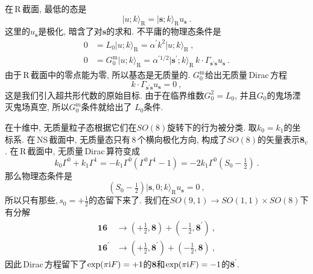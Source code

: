 在\,R\,截面, 最低的态是
\begin{equation}
    \lvert u;k\rangle_{\text{R}} = \lvert\mathbf{s};k\rangle_{\text{R}} u_{\mathbf{s}} \:. \label{10.5.12}
\end{equation}
这里的$ u_{\mathbf{s}} $是极化, 暗含了对$ \mathbf{s} $的求和. 不平庸的物理态条件是
\begin{subequations}
    \begin{align}
        0 &= L_{0}\lvert u;k\rangle_{\text{R}} = \alpha^{\prime}k^{2}\lvert u;k\rangle_{\text{R}} \:, \label{10.5.13a}\\
        0 &= G_{0}^{\text{m}}\lvert u;k\rangle_{\text{R}}
        =\alpha^{\prime 1/2} \lvert \mathbf{s}^{\prime};k\rangle_{\text{R}}\, k\cdot \Gamma_{\mathbf{s}^{\prime}\mathbf{s}} u_{\mathbf{s}} \:. \label{10.5.13b}
    \end{align} \label{10.5.13}
\end{subequations}
由于\,R\,截面中的零点能为零, 所以基态是无质量的. $G_{0}^{\text{m}} $给出无质量\,Dirac\,方程
\begin{equation}
    k\cdot \Gamma_{\mathbf{s}^{\prime}\mathbf{s}} u_{\mathbf{s}} =0\:, \label{10.5.14}
\end{equation}
这是我们引入超共形代数的原始目标. 由于在临界维数$ G_{0}^{2} = L_{0}$, 并且$ G_{0} $的鬼场湮灭鬼场真空, 所以$ G_{0}^{\text{m}} $条件就给出了 $L_{0} $条件. 

在十维中, 无质量粒子态根据它们在$ SO(8) $旋转下的行为被分类. 取$ k_{0}=k_{1} $的坐标系. 在\,NS\,截面中, 无质量态只有\,8\,个横向极化方向, 构成了$ SO(8) $的矢量表示$ \mathbf{8}_{v}$. 在\,R\,截面中, 无质量\,Dirac\,算符变成
\begin{equation}
    k_{0}\Gamma^{0}+k_{1}\Gamma^{1} = -k_{1}\Gamma^{0}(\Gamma^{0}\Gamma^{1}-1)=-2k_{1}\Gamma^{0}(S_{0}-\tfrac{1}{2})\:.\label{10.5.15}
\end{equation}
那么物理态条件是
\begin{equation}
    (S_{0}-\tfrac{1}{2})\lvert\mathbf{s},0;k\rangle_{\text{R}} u_{\mathbf{s}} =0 \:,\label{10.5.16}
\end{equation}
所以只有那些$,s_{0}=+\frac{1}{2} $的态留下来了. 我们在$ SO(9,1)\to SO(1,1)\times SO(8) $下有分解
\begin{subequations}
    \begin{align}
        \mathbf{16} &\to (+\tfrac{1}{2},\mathbf{8}) + (-\tfrac{1}{2},\mathbf{8}^{\prime}) \:, \label{10.5.17a} \\
        \mathbf{16}^{\prime} &\to (+\tfrac{1}{2},\mathbf{8}^{\prime}) + (-\tfrac{1}{2},\mathbf{8})\:, \label{10.5.17b}
    \end{align}  \label{10.5.17}
\end{subequations}
因此\,Dirac\,方程留下了$ \exp(\pi\mathrm{i} F)=+1 $的$ \mathbf{8} $和$ \exp(\pi\mathrm{i} F)=-1 $的$ \mathbf{8}^{\prime}$.

